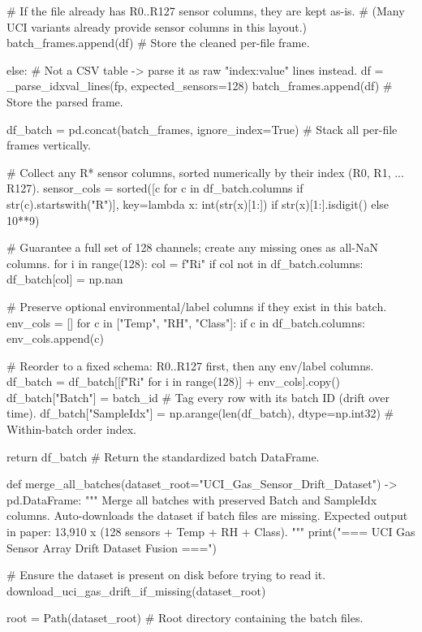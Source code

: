             # If the file already has R0..R127 sensor columns, they are kept as-is.
            # (Many UCI variants already provide sensor columns in this layout.)
            batch_frames.append(df)        # Store the cleaned per-file frame.

        else:
            # Not a CSV table -> parse it as raw "index:value" lines instead.
            df = _parse_idxval_lines(fp, expected_sensors=128)
            batch_frames.append(df)        # Store the parsed frame.

    df_batch = pd.concat(batch_frames, ignore_index=True)  # Stack all per-file frames vertically.

    # Collect any R* sensor columns, sorted numerically by their index (R0, R1, ... R127).
    sensor_cols = sorted([c for c in df_batch.columns if str(c).startswith("R")],
                         key=lambda x: int(str(x)[1:]) if str(x)[1:].isdigit() else 10**9)

    # Guarantee a full set of 128 channels; create any missing ones as all-NaN columns.
    for i in range(128):
        col = f"R{i}"
        if col not in df_batch.columns:
            df_batch[col] = np.nan

    # Preserve optional environmental/label columns if they exist in this batch.
    env_cols = []
    for c in ["Temp", "RH", "Class"]:
        if c in df_batch.columns:
            env_cols.append(c)

    # Reorder to a fixed schema: R0..R127 first, then any env/label columns.
    df_batch = df_batch[[f"R{i}" for i in range(128)] + env_cols].copy()
    df_batch["Batch"] = batch_id           # Tag every row with its batch ID (drift over time).
    df_batch["SampleIdx"] = np.arange(len(df_batch), dtype=np.int32)  # Within-batch order index.

    return df_batch                        # Return the standardized batch DataFrame.

def merge_all_batches(dataset_root="UCI_Gas_Sensor_Drift_Dataset") -> pd.DataFrame:
    """
    Merge all batches with preserved Batch and SampleIdx columns.
    Auto-downloads the dataset if batch files are missing.
    Expected output in paper: 13,910 x (128 sensors + Temp + RH + Class).
    """
    print("=== UCI Gas Sensor Array Drift Dataset Fusion ===")

    # Ensure the dataset is present on disk before trying to read it.
    download_uci_gas_drift_if_missing(dataset_root)

    root = Path(dataset_root)              # Root directory containing the batch files.

